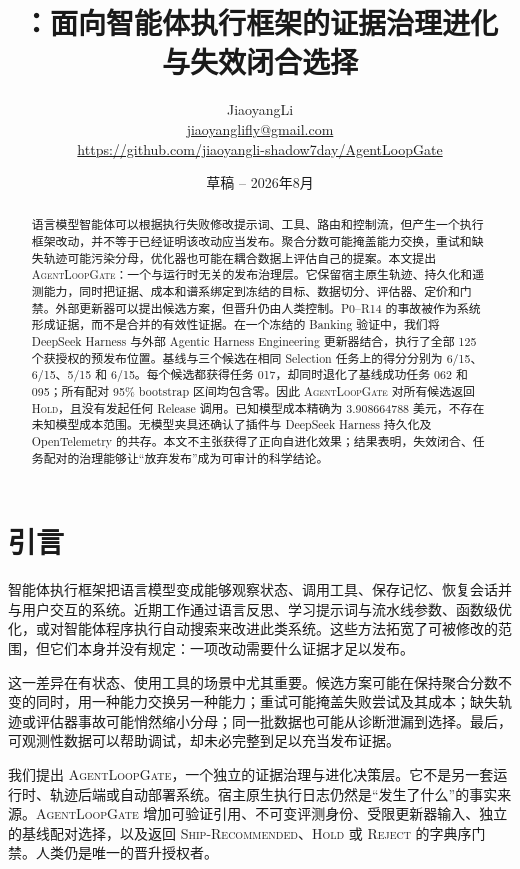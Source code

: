 \documentclass[UTF8,10pt,twocolumn,fontset=none]{ctexart}
\title{\system：面向智能体执行框架的证据治理进化\\与失效闭合选择}
\author{JiaoyangLi\\
\small \href{mailto:jiaoyanglifly@gmail.com}{jiaoyanglifly@gmail.com}\\
\small \url{https://github.com/jiaoyangli-shadow7day/AgentLoopGate}}
\date{草稿 -- 2026年8月}
\newcommand{\system}{\textsc{AgentLoopGate}\xspace}
\newcommand{\hold}{\textsc{Hold}\xspace}
\newcommand{\ship}{\textsc{Ship-Recommended}\xspace}
\newcommand{\reject}{\textsc{Reject}\xspace}
\begin{document}
\pagestyle{plain}
\maketitle

\begin{abstract}
语言模型智能体可以根据执行失败修改提示词、工具、路由和控制流，但产生一个执行框架改动，并不等于已经证明该改动应当发布。聚合分数可能掩盖能力交换，重试和缺失轨迹可能污染分母，优化器也可能在耦合数据上评估自己的提案。本文提出 \system：一个与运行时无关的发布治理层。它保留宿主原生轨迹、持久化和遥测能力，同时把证据、成本和谱系绑定到冻结的目标、数据切分、评估器、定价和门禁。外部更新器可以提出候选方案，但晋升仍由人类控制。P0--R14 的事故被作为系统形成证据，而不是合并的有效性证据。在一个冻结的 Banking 验证中，我们将 DeepSeek Harness 与外部 Agentic Harness Engineering 更新器结合，执行了全部 125 个获授权的预发布位置。基线与三个候选在相同 Selection 任务上的得分分别为 6/15、6/15、5/15 和 6/15。每个候选都获得任务 017，却同时退化了基线成功任务 062 和 095；所有配对 95\% bootstrap 区间均包含零。因此 \system 对所有候选返回 \hold，且没有发起任何 Release 调用。已知模型成本精确为 3.908664788 美元，不存在未知模型成本范围。无模型夹具还确认了插件与 DeepSeek Harness 持久化及 OpenTelemetry 的共存。本文不主张获得了正向自进化效果；结果表明，失效闭合、任务配对的治理能够让“放弃发布”成为可审计的科学结论。
\end{abstract}

\section{引言}

智能体执行框架把语言模型变成能够观察状态、调用工具、保存记忆、恢复会话并与用户交互的系统。近期工作通过语言反思\cite{shinn2023reflexion,madaan2023selfrefine}、学习提示词与流水线参数\cite{khattab2023dspy}、函数级优化\cite{zhang2024agentoptimizer}，或对智能体程序执行自动搜索\cite{hu2024adas}来改进此类系统。这些方法拓宽了可被修改的范围，但它们本身并没有规定：一项改动需要什么证据才足以发布。

这一差异在有状态、使用工具的场景中尤其重要。候选方案可能在保持聚合分数不变的同时，用一种能力交换另一种能力；重试可能掩盖失败尝试及其成本；缺失轨迹或评估器事故可能悄然缩小分母；同一批数据也可能从诊断泄漏到选择。最后，可观测性数据可以帮助调试，却未必完整到足以充当发布证据。

我们提出 \system，一个独立的证据治理与进化决策层。它不是另一套运行时、轨迹后端或自动部署系统。宿主原生执行日志仍然是“发生了什么”的事实来源。\system 增加可验证引用、不可变评测身份、受限更新器输入、独立的基线配对选择，以及返回 \ship、\hold 或 \reject 的字典序门禁。人类仍是唯一的晋升授权者。
\end{document}
